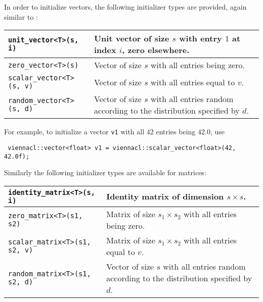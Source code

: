In order to initialize vectors, the following initializer types are provided, again similar to {\ublas}:
\begin{center}
\begin{tabular}{|l|p{10cm}|}
 \hline
 \lstinline|unit_vector<T>(s, i)| & Unit vector of size $s$ with entry $1$ at index $i$, zero elsewhere. \\
 \hline
 \lstinline|zero_vector<T>(s)| & Vector of size $s$ with all entries being zero. \\
 \hline
 \lstinline|scalar_vector<T>(s, v)| & Vector of size $s$ with all entries equal to $v$. \\
 \hline
 \lstinline|random_vector<T>(s, d)| & Vector of size $s$ with all entries random according to the distribution specified by $d$. \\
 \hline
\end{tabular}
\end{center}
For example, to initialize a vector \lstinline|v1| with all $42$ entries being $42.0$, use
\begin{lstlisting}
 viennacl::vector<float> v1 = viennacl::scalar_vector<float>(42, 42.0f);
\end{lstlisting}

Similarly the following initializer types are available for matrices:
\begin{center}
\begin{tabular}{|l|p{10cm}|}
 \hline
 \lstinline|identity_matrix<T>(s, i)| & Identity matrix of dimension $s \times s$. \\
 \hline
 \lstinline|zero_matrix<T>(s1, s2)| & Matrix of size $s_1 \times s_2$ with all entries being zero. \\
 \hline
 \lstinline|scalar_matrix<T>(s1, s2, v)| & Matrix of size $s_1 \times s_2$ with all entries equal to $v$. \\
 \hline
 \lstinline|random_matrix<T>(s1, s2, d)| & Vector of size $s$ with all entries random according to the distribution specified by $d$. \\
 \hline
\end{tabular}
\end{center}

